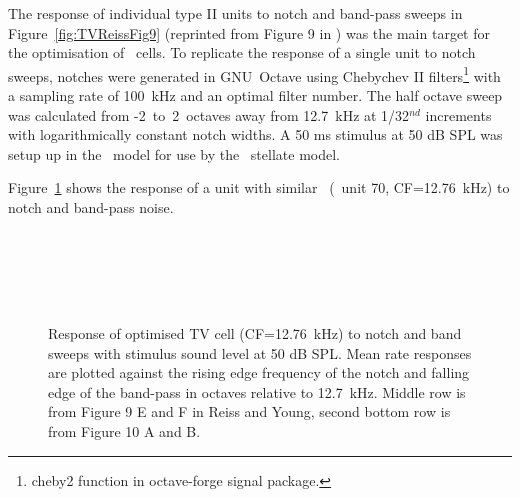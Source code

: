 The response of individual type II units to notch and band-pass sweeps in Figure~\ref{fig:TVReissFig9} (reprinted from Figure 9 in \citep*{ReissYoung:2005}) was the main target for the optimisation of \TV~cells.
To replicate the response of a single unit to notch sweeps, notches were generated in GNU~Octave using Chebychev II filters\footnote{\textsf{cheby2} function   in octave-forge signal package.}  with a sampling rate of 100~kHz and an optimal filter number.
The half octave sweep was calculated from -2~to~2~octaves away from 12.7~kHz at 1/32$^{nd}$ increments with logarithmically constant notch widths\footnotemark. A 50 ms stimulus at 50 dB SPL was setup up in the \AN~model for use by the \CN~stellate model.



Figure~\ref{fig:TV_SweepUnit70} shows the response of a unit with similar \CF~(\TV~unit 70, CF=12.76~kHz) to notch and band-pass noise.

\begin{figure}[htb]
  \\
  \\
  \\ \\
  \caption[Response of optimised TV cell (CF=12.76~kHz) to notch and band   sweeps]{Response of optimised TV cell (CF=12.76~kHz) to notch and band sweeps with stimulus sound level at 50 dB SPL\@.
Mean rate responses are plotted against the rising edge frequency of the notch and falling edge of the band-pass in octaves relative to 12.7~kHz.
Middle row is from Figure 9 E and F in Reiss and Young, second bottom row is from Figure 10 A and B. }   \label{fig:TV_SweepUnit70}
\end{figure}


